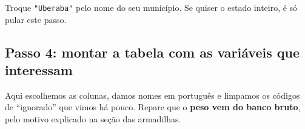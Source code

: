 \documentclass[
]{book}
\newenvironment{Shaded}{\begin{snugshade}}{\end{snugshade}}
\newcommand{\CommentTok}[1]{\textcolor[rgb]{0.56,0.35,0.01}{\textit{#1}}}
\newcommand{\FunctionTok}[1]{\textcolor[rgb]{0.13,0.29,0.53}{\textbf{#1}}}
\newcommand{\NormalTok}[1]{#1}
\newcommand{\OtherTok}[1]{\textcolor[rgb]{0.56,0.35,0.01}{#1}}
\newcommand{\SpecialCharTok}[1]{\textcolor[rgb]{0.81,0.36,0.00}{\textbf{#1}}}
\newcommand{\StringTok}[1]{\textcolor[rgb]{0.31,0.60,0.02}{#1}}
\begin{document}
\begin{Shaded}
\end{Shaded}

Troque \texttt{"Uberaba"} pelo nome do seu município. Se quiser o estado inteiro, é só pular este passo.

\subsection{Passo 4: montar a tabela com as variáveis que interessam}\label{passo-4-montar-a-tabela-com-as-variuxe1veis-que-interessam}

Aqui escolhemos as colunas, damos nomes em português e limpamos os códigos de ``ignorado'' que vimos há pouco. Repare que o \textbf{peso vem do banco bruto}, pelo motivo explicado na seção das armadilhas.
\end{document}
